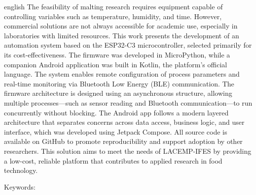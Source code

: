 \begin{resumo}[Abstract]
  \vspace{-15pt}
  
  \begin{otherlanguage*}{english}
  The feasibility of malting research requires equipment capable of controlling variables such as temperature, humidity, and time. However, commercial solutions are not always accessible for academic use, especially in laboratories with limited resources. This work presents the development of an automation system based on the ESP32-C3 microcontroller, selected primarily for its cost-effectiveness. The firmware was developed in MicroPython, while a companion Android application was built in Kotlin, the platform’s official language. The system enables remote configuration of process parameters and real-time monitoring via Bluetooth Low Energy (BLE) communication. The firmware architecture is designed using an asynchronous structure, allowing multiple processes—such as sensor reading and Bluetooth communication—to run concurrently without blocking. The Android app follows a modern layered architecture that separates concerns across data access, business logic, and user interface, which was developed using Jetpack Compose. All source code is available on GitHub to promote reproducibility and support adoption by other researchers. This solution aims to meet the needs of LACEMP-IFES by providing a low-cost, reliable platform that contributes to applied research in food technology.

  
  Keywords: \inlinekeywords
\end{otherlanguage*}
\end{resumo}